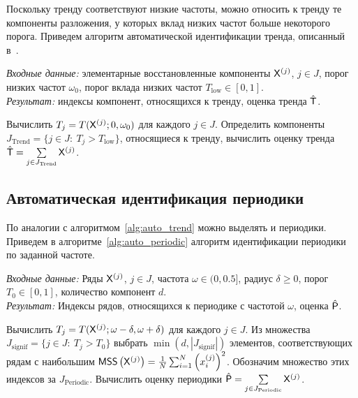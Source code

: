 \documentclass[specialist,
substylefile = spbu_report.rtx,
subf,12pt]{disser}
\newcommand{\Input}{\emph{Входные данные: }}
\newcommand{\Output}{\emph{Результат: }}
\theoremstyle{definition}
\begin{document}
Поскольку тренду соответствуют низкие частоты, можно относить к тренду те компоненты разложения, у которых вклад низких частот больше некоторого порога. Приведем алгоритм автоматической идентификации тренда, описанный в~\cite{AlexandrovGolyandina2004}.

\begin{algorithm}[H]
	\caption{TAI$(\omega_0, T_\text{low})$~\cite{AlexandrovGolyandina2004}}\label{alg:auto_trend}
	\Input элементарные восстановленные компоненты $\mathsf{X}^{(j)}$, $j\in J$, порог низких частот $\omega_0$, порог вклада низких частот $T_\text{low}\in[0, 1]$.\\
	\Output индексы компонент, относящихся к тренду, оценка тренда $\hat{\mathsf{T}}$.
	\begin{algorithmic}[1]
		\State Вычислить $T_j=T(\mathsf{X}^{(j)};0,\omega_0)$ для каждого $j\in J$.
		\State Определить компоненты $J_\text{Trend}=\{j\in J:~T_j > T_\text{low}\}$, относящиеся к тренду, вычислить оценку тренда $\hat {\mathsf{T}}=\sum\limits_{j\in J_\text{Trend}} \mathsf{X}^{(j)}$.
	\end{algorithmic}
\end{algorithm}

\subsection{Автоматическая идентификация периодики}

По аналогии с алгоритмом~\ref{alg:auto_trend} можно выделять и периодики. Приведем в алгоритме~\ref{alg:auto_periodic} алгоритм идентификации периодики по заданной частоте.

\begin{algorithm}[!ht]
	\caption{Алгоритм идентификации периодики по заданной частоте}\label{alg:auto_periodic}
	\Input Ряды $\mathsf{X}^{(j)}$, $j\in J$, частота $\omega\in(0, 0.5]$, радиус $\delta \geqslant 0$, порог $T_0\in[0, 1]$, количество компонент $d$. \\
	\Output Индексы рядов, относящихся к периодике с частотой $\omega$, оценка $\hat{\mathsf{P}}$.
	\begin{algorithmic}[1]
		\State Вычислить $T_j=T(\mathsf{X}^{(j)};\omega - \delta,\omega + \delta)$ для каждого $j\in J$.
		\State Из множества $J_\text{signif}=\{j\in J:~T_j > T_0\}$ выбрать $\min(d, |J_\text{signif}|)$ элементов, соответствующих рядам с наибольшим $\mathsf{MSS}\left(\mathsf{X}^{(j)}\right)=\frac{1}{N}\sum^{N}_{i=1}\left(x^{(j)}_i\right)^2$. Обозначим множество этих индексов за $J_\text{Periodic}$.
		\State Вычислить оценку периодики $\hat {\mathsf{P}}=\sum\limits_{j\in J_\text{Periodic}} \mathsf{X}^{(j)}$.
	\end{algorithmic}
\end{algorithm}
\end{document}
